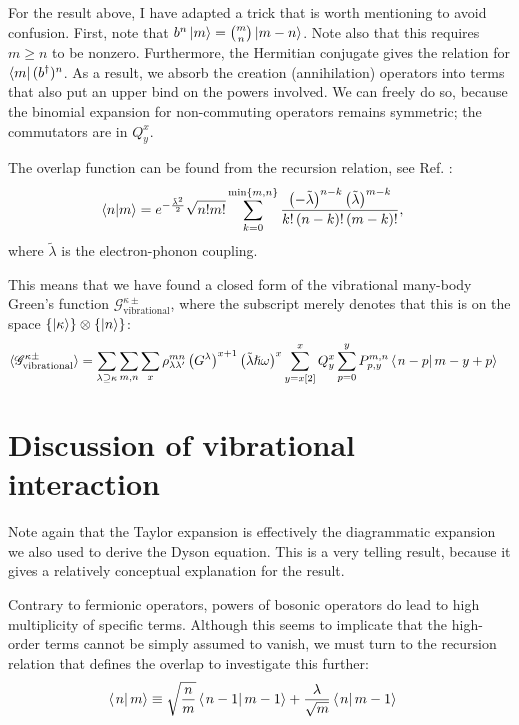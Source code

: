 For the result above, I have adapted a trick that is worth mentioning to avoid confusion. First, note that $b^n \ket{m} = \binom{m}{n} \ket{m-n}$. Note also that this requires $m\geq n$ to be nonzero. Furthermore, the Hermitian conjugate gives the relation for $\bra{m} (b^\dagger)^n$. As a result, we absorb the creation (annihilation) operators into terms that also put an upper bind on the powers involved. We can freely do so, because the binomial expansion for non-commuting operators remains symmetric; the commutators are in $Q^x_y$. 


The overlap function can be found from the recursion relation, see Ref. \cite{kaspermothpoulsen}:
\begin{align*}
\braket{n|m} &= e^{-\frac{\tilde{\lambda}^2}{2}} \sqrt{n! m!} \sum_{k=0}^{ \text{min}\left\{ m, n \right\}} \frac{ \left(-\tilde{\lambda}\right)^{n-k} \left(\tilde{\lambda}\right)^{m-k}}{ k! \left( n -k\right)! \left( m - k \right)!},
\end{align*} 
where $\tilde{\lambda}$ is the electron-phonon coupling.

This means that we have found a closed form of the vibrational many-body Green's function $\mathscr{G}^{\kappa\pm}_\text{vibrational}$, where the subscript merely denotes that this is on the space $\left\{\ket{\kappa}\right\} \otimes \left\{\ket{n}\right\}$:
\begin{align}
\braket{\mathscr{G}^{\kappa\pm}_\text{vibrational}}&= \sum_{\lambda\supseteq \kappa} \sum_{m,n} \sum_x\rho_{\lambda\lambda^\prime}^{mn}  \left(G^\lambda \right)^{x+1} \left(\tilde{\lambda}\hslash\omega\right)^x
 \sum_{y=x[2]}^x Q^x_y \sum_{p=0}^{y} P^{m,n}_{p,y} \braket{\left. n-p \right| m-y+p} \label{eq:vibgf}
\end{align}

\section{Discussion of vibrational interaction}

Note again that the Taylor expansion is effectively the diagrammatic expansion we also used to derive the Dyson equation. This is a very telling result, because it gives a relatively conceptual explanation for the result.

Contrary to fermionic operators, powers of bosonic operators do lead to high multiplicity of specific terms. Although this seems to implicate that the high-order terms cannot be simply assumed to vanish, we must turn to the recursion relation that defines the overlap to investigate this further:
\begin{align*}
\braket{\left. n\right|m} &\equiv \sqrt{\frac{n}{m}} \braket{\left. n-1\right|m-1} + \frac{\lambda}{\sqrt{m}} \braket{\left. n\right|m-1}
\end{align*}

